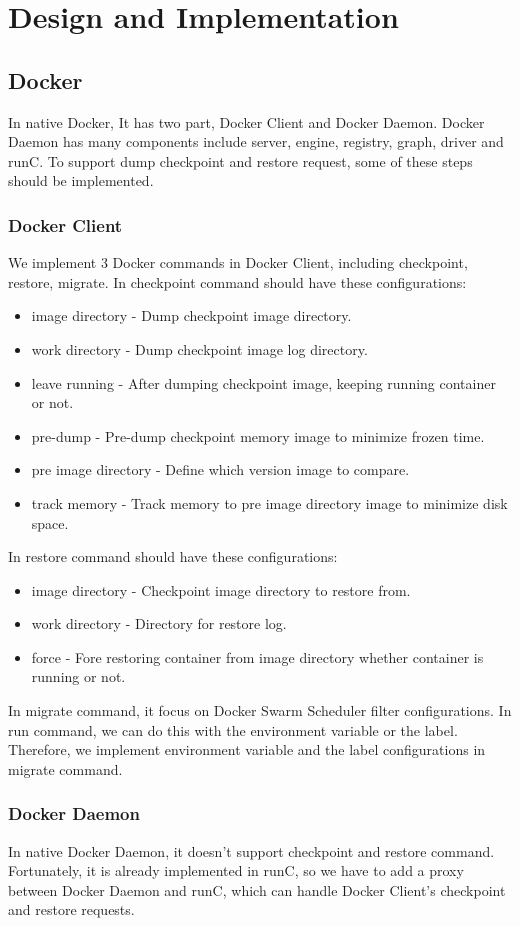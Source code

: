 \chapter{Design and Implementation}
\label{chap:design}
\section{Docker}
In native Docker, It has two part, Docker Client and Docker Daemon. Docker Daemon has many components include server, engine, registry, graph, driver and runC. To  support dump checkpoint and restore request, some of these steps should be implemented.

\subsection{Docker Client}
We implement 3 Docker commands in Docker Client, including checkpoint, restore, migrate. In checkpoint command should have these configurations:
\begin{itemize}
	\item image directory - Dump checkpoint image directory.
	\item work directory - Dump checkpoint image log directory.
	\item leave running - After dumping checkpoint image, keeping running container or not.
	\item pre-dump - Pre-dump checkpoint memory image to minimize frozen time.
	\item pre image directory - Define which version image to compare.
	\item track memory - Track memory to pre image directory image to minimize disk space.
\end{itemize}
In restore command should have these configurations:
\begin{itemize}
	\item image directory - Checkpoint image directory to restore from.
	\item work directory - Directory for restore log.
	\item force - Fore restoring container from image directory whether container is running or not.
\end{itemize}
In migrate command, it focus on Docker Swarm Scheduler filter configurations. In run command, we can do this with the environment variable or the label. Therefore, we implement environment variable and the label configurations in migrate command.

\subsection{Docker Daemon}
In native Docker Daemon, it doesn't support checkpoint and restore command.
Fortunately, it is already implemented in runC, so we have to add a proxy between Docker Daemon and runC, which can handle Docker Client's checkpoint and restore requests.

